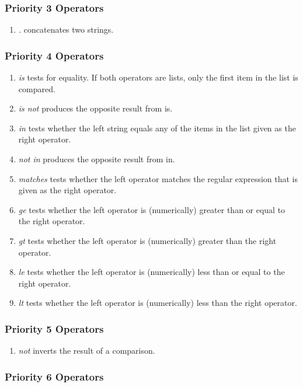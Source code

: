 \subsubsection{Priority 3 Operators}

\begin{enumerate}
\item {\it .} concatenates two strings.
\end{enumerate}


\subsubsection{Priority 4 Operators}

\begin{enumerate}
\item {\it is} tests for equality. If both operators are lists, only the 
first item in the list is compared.
\item {\it is not} produces the opposite result from is.
\item {\it in} tests whether the left string equals any of the items in the 
list given as the right operator.
\item {\it not in} produces the opposite result from in.
\item {\it matches} tests whether the left operator matches the regular 
expression that is given as the right operator. 
\item {\it ge} tests whether the left operator is (numerically) greater than 
or equal to the right operator. 
\item {\it gt} tests whether the left operator is (numerically) greater than 
the right operator. 
\item {\it le} tests whether the left operator is (numerically) less than or 
equal to the right operator. 
\item {\it lt} tests whether the left operator is (numerically) less than the 
right operator. 
\end{enumerate}


\subsubsection{Priority 5 Operators}

\begin{enumerate}
\item {\it not} inverts the result of a comparison. 
\end{enumerate}


\subsubsection{Priority 6 Operators}

